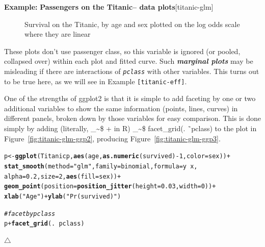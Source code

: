 \documentclass{article}
\makeatletter
\newcommand{\hlnum}[1]{\textcolor[rgb]{0.686,0.059,0.569}{#1}}%
\newcommand{\hlstr}[1]{\textcolor[rgb]{0.192,0.494,0.8}{#1}}%
\newcommand{\hlcom}[1]{\textcolor[rgb]{0.678,0.584,0.686}{\textit{#1}}}%
\newcommand{\hlopt}[1]{\textcolor[rgb]{0,0,0}{#1}}%
\newcommand{\hlstd}[1]{\textcolor[rgb]{0.345,0.345,0.345}{#1}}%
\newcommand{\hlkwb}[1]{\textcolor[rgb]{0.69,0.353,0.396}{#1}}%
\newcommand{\hlkwc}[1]{\textcolor[rgb]{0.333,0.667,0.333}{#1}}%
\newcommand{\hlkwd}[1]{\textcolor[rgb]{0.737,0.353,0.396}{\textbf{#1}}}%
\newenvironment{kframe}{%
 \def\at@end@of@kframe{}%
 \ifinner\ifhmode%
  \def\at@end@of@kframe{\end{minipage}}%
  \begin{minipage}{\columnwidth}%
 \fi\fi%
 \def\FrameCommand##1{\hskip\@totalleftmargin \hskip-\fboxsep
 \colorbox{shadecolor}{##1}\hskip-\fboxsep
     \hskip-\linewidth \hskip-\@totalleftmargin \hskip\columnwidth}%
 \MakeFramed {\advance\hsize-\width
   \@totalleftmargin\z@ \linewidth\hsize
   \@setminipage}}%
 {\par\unskip\endMakeFramed%
 \at@end@of@kframe}
\newenvironment{knitrout}{}{} %
\newcommand{\figref}[1]{Figure~\ref{#1}}
\newcommand{\var}[1]{\textit{\texttt{#1}}}
\newcommand\code{\bgroup\@makeother\_\@makeother\~\@makeother\$\@codex}
\def\@codex#1{{\normalfont\ttfamily\hyphenchar\font=-1 #1}\egroup}
\let\proglang=\textsf
\newcommand{\R}{\proglang{R}\xspace}
\newcommand{\pkg}[1]{\textsf{#1}\nocite{R-#1}}
\newcommand{\term}[1]{\textit{\textbf{#1}}}
\newenvironment{Example}[2][unnamed-example]%
  {\medskip\noindent\textbf{\textsf{Example:}}
   \textbf{#2}\hfill [#1]\par\smallskip
  }
  {\hfill $\triangle$}
\makeatother
\begin{document}
\begin{Example}[titanic-glm]{Passengers on the Titanic-- data plots}
\begin{knitrout}
\begin{figure}[hb]
{}

\caption[Survival on the Titanic, by age and sex plotted on the log odds scale where they are linear]{Survival on the Titanic, by age and sex plotted on the log odds scale where they are linear}\label{fig:titanic-glm-ggp-logit}
\end{figure}


\end{knitrout}


These plots don't use passenger class, so this variable is ignored
(or pooled, collapsed over) within each plot and fitted curve.   
Such \term{marginal plots} may be misleading
if there are interactions of \var{pclass} with other variables.
This turns out to be true here, as we will see in Example \texttt{[titanic-eff]}.

One of the strengths
of \pkg{ggplot2} is that it is simple to add faceting by one or two
additional variables to show the same information (points, lines, curves)
in different panels, broken down by those variables for easy comparison.
This is done simply by adding (literally, \code{+} in \R) 
\code{facet\_grid(. \~\ pclass)} to the plot in \figref{fig:titanic-glm-ggp2},
producing \figref{fig:titanic-glm-ggp3}.
\begin{knitrout}
\color{fgcolor}\begin{kframe}
\begin{alltt}
\hlstd{p} \hlkwb{<-} \hlkwd{ggplot}\hlstd{(Titanicp,} \hlkwd{aes}\hlstd{(age,} \hlkwd{as.numeric}\hlstd{(survived)}\hlopt{-}\hlnum{1}\hlstd{,} \hlkwc{color}\hlstd{=sex))} \hlopt{+}
  \hlkwd{stat_smooth}\hlstd{(}\hlkwc{method}\hlstd{=}\hlstr{"glm"}\hlstd{,} \hlkwc{family}\hlstd{=binomial,} \hlkwc{formula}\hlstd{=y}\hlopt{~}\hlstd{x,}
              \hlkwc{alpha}\hlstd{=}\hlnum{0.2}\hlstd{,} \hlkwc{size}\hlstd{=}\hlnum{2}\hlstd{,} \hlkwd{aes}\hlstd{(}\hlkwc{fill}\hlstd{=sex))} \hlopt{+}
        \hlkwd{geom_point}\hlstd{(}\hlkwc{position}\hlstd{=}\hlkwd{position_jitter}\hlstd{(}\hlkwc{height}\hlstd{=}\hlnum{0.03}\hlstd{,} \hlkwc{width}\hlstd{=}\hlnum{0}\hlstd{))} \hlopt{+}
        \hlkwd{xlab}\hlstd{(}\hlstr{"Age"}\hlstd{)} \hlopt{+} \hlkwd{ylab}\hlstd{(}\hlstr{"Pr (survived)"}\hlstd{)}

\hlcom{# facet by pclass}
\hlstd{p} \hlopt{+} \hlkwd{facet_grid}\hlstd{(.} \hlopt{~} \hlstd{pclass)}
\end{alltt}
\end{kframe}\begin{figure}[hb]


\end{figure}
\end{knitrout}
\end{Example}
\end{document}
